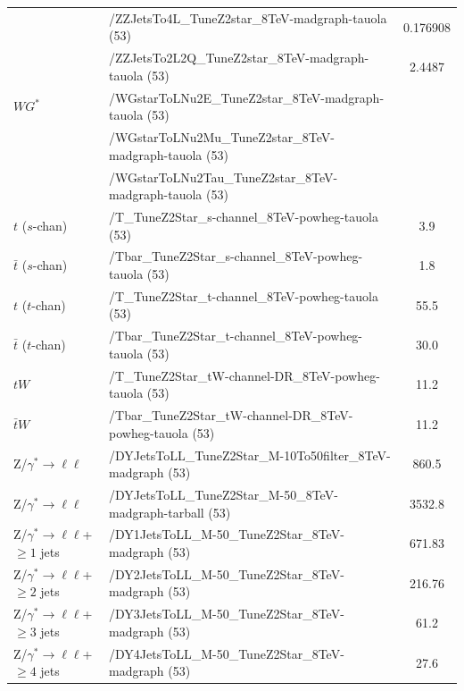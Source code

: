 \begin{table}[pht]
\begin{center}
{\begin{tabular}{l|l|c}
        & /ZZJetsTo4L\_TuneZ2star\_8TeV-madgraph-tauola (53)            &   0.176908\\
        & /ZZJetsTo2L2Q\_TuneZ2star\_8TeV-madgraph-tauola (53)          &   2.4487\\
$WG^{*}$  & /WGstarToLNu2E\_TuneZ2star\_8TeV-madgraph-tauola (53)          &  \\
        & /WGstarToLNu2Mu\_TuneZ2star\_8TeV-madgraph-tauola (53)          &  \\
        & /WGstarToLNu2Tau\_TuneZ2star\_8TeV-madgraph-tauola (53)          &  \\
$t$ ($s$-chan)                           &   /T\_TuneZ2Star\_s-channel\_8TeV-powheg-tauola (53)                        &  3.9 \\
$\bar{t}$ ($s$-chan)                     &   /Tbar\_TuneZ2Star\_s-channel\_8TeV-powheg-tauola (53)                      &  1.8 \\
$t$ ($t$-chan)                           &   /T\_TuneZ2Star\_t-channel\_8TeV-powheg-tauola (53)                         &  55.5 \\
$\bar{t}$ ($t$-chan)                     &   /Tbar\_TuneZ2Star\_t-channel\_8TeV-powheg-tauola (53)                      &  30.0 \\
$tW$                                     &   /T\_TuneZ2Star\_tW-channel-DR\_8TeV-powheg-tauola (53)                     &  11.2 \\
$\bar{t} W$                               &   /Tbar\_TuneZ2Star\_tW-channel-DR\_8TeV-powheg-tauola (53)                  &  11.2 \\
Z/$\gamma^* \rightarrow \ell \ell$      & /DYJetsToLL\_TuneZ2Star\_M-10To50filter\_8TeV-madgraph (53)                   &  860.5 \\
Z/$\gamma^* \rightarrow \ell \ell$      & /DYJetsToLL\_TuneZ2Star\_M-50\_8TeV-madgraph-tarball (53)                   &  3532.8 \\
Z/$\gamma^* \rightarrow \ell \ell$+$\geq 1$ jets       & /DY1JetsToLL\_M-50\_TuneZ2Star\_8TeV-madgraph (53)                   &  671.83 \\
Z/$\gamma^* \rightarrow \ell \ell$+$\geq 2$ jets       & /DY2JetsToLL\_M-50\_TuneZ2Star\_8TeV-madgraph (53)                   &  216.76 \\
Z/$\gamma^* \rightarrow \ell \ell$+$\geq 3$ jets       & /DY3JetsToLL\_M-50\_TuneZ2Star\_8TeV-madgraph (53)                   &  61.2 \\
Z/$\gamma^* \rightarrow \ell \ell$+$\geq 4$ jets       & /DY4JetsToLL\_M-50\_TuneZ2Star\_8TeV-madgraph (53)                   &  27.6 \\

\end{tabular}}
\end{center}
\end{table}
